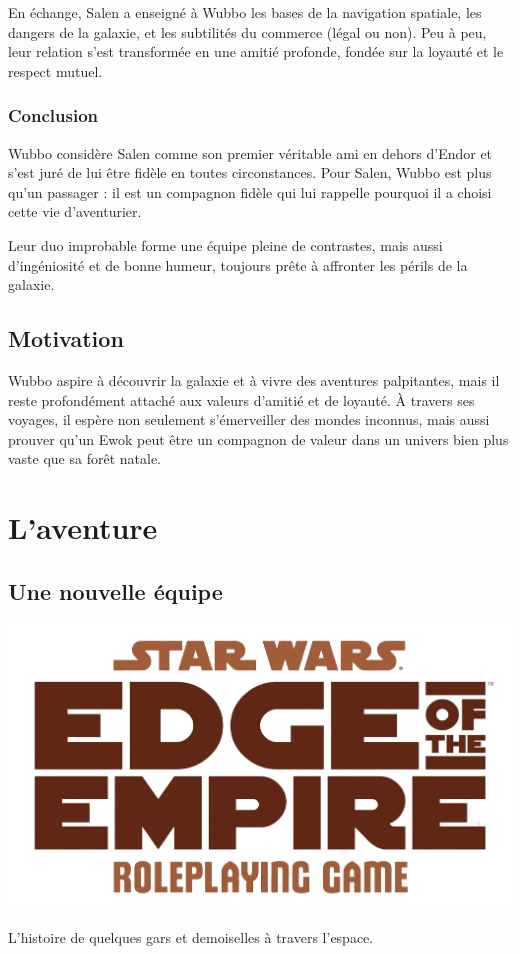 \documentclass[a4paper,9pt,twoside,twocolumn,openany]{book}
\begin{document}
En échange, Salen a enseigné à Wubbo les bases de la navigation spatiale, les dangers de la galaxie, et les subtilités du commerce (légal ou non). Peu à peu, leur relation s’est transformée en une amitié profonde, fondée sur la loyauté et le respect mutuel.

\subsection{Conclusion}
Wubbo considère Salen comme son premier véritable ami en dehors d’Endor et s’est juré de lui être fidèle en toutes circonstances. Pour Salen, Wubbo est plus qu’un passager : il est un compagnon fidèle qui lui rappelle pourquoi il a choisi cette vie d’aventurier.

Leur duo improbable forme une équipe pleine de contrastes, mais aussi d’ingéniosité et de bonne humeur, toujours prête à affronter les périls de la galaxie.

\section{Motivation}

Wubbo aspire à découvrir la galaxie et à vivre des aventures palpitantes, mais il reste profondément attaché aux valeurs d’amitié et de loyauté. À travers ses voyages, il espère non seulement s’émerveiller des mondes inconnus, mais aussi prouver qu’un Ewok peut être un compagnon de valeur dans un univers bien plus vaste que sa forêt natale.

\chapter{L'aventure}

\section{Une nouvelle équipe}
\subtitle{?? décembre 2024}


\clearevenpage

\onecolumn
\Large

\centering

\vfill

\includegraphics[width=1\textwidth]{img/SWEotE}


\vfill

L'histoire de quelques gars et demoiselles à travers l'espace.
\vfill

\end{document}

